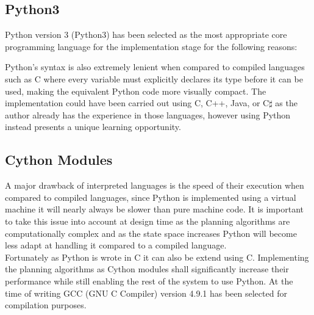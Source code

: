 \subsection{Python3}
Python version 3 (Python3) has been selected as the most appropriate core programming language for the implementation stage for the following reasons:


\noindent
Python's syntax is also extremely lenient when compared to compiled languages such as C where every variable must explicitly declares its type before it can be used, making the equivalent Python code more visually compact. The implementation could have been carried out using C, C++, Java, or C$\sharp$ as the author already has the experience in those languages, however using Python instead presents a unique learning opportunity. 

\subsection{Cython Modules}
\noindent
A major drawback of interpreted languages is the speed of their execution when compared to compiled languages, since Python is implemented using a virtual machine it will nearly always be slower than pure machine code. It is important to take this issue into account at design time as the planning algorithms are computationally complex and as the state space increases Python will become less adapt at handling it compared to a compiled language. \\

\noindent
Fortunately as Python is wrote in C it can also be extend using C. Implementing the planning algorithms as Cython modules shall significantly increase their performance while still enabling the rest of the system to use Python. At the time of writing GCC (GNU C Compiler) version 4.9.1 has been selected for compilation purposes.

